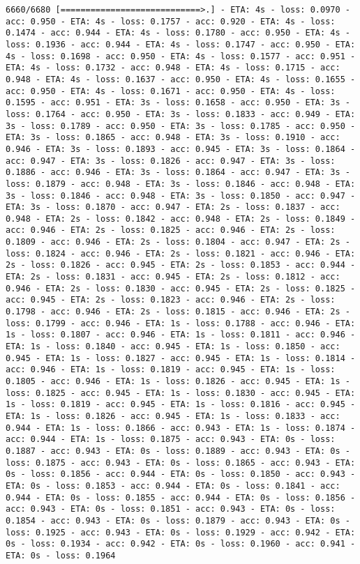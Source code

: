 \documentclass[11pt]{article}
\begin{document}
\begin{Verbatim}[commandchars=\\\{\}]
6660/6680 [============================>.] - ETA: 4s - loss: 0.0970 - acc: 0.950 - ETA: 4s - loss: 0.1757 - acc: 0.920 - ETA: 4s - loss: 0.1474 - acc: 0.944 - ETA: 4s - loss: 0.1780 - acc: 0.950 - ETA: 4s - loss: 0.1936 - acc: 0.944 - ETA: 4s - loss: 0.1747 - acc: 0.950 - ETA: 4s - loss: 0.1698 - acc: 0.950 - ETA: 4s - loss: 0.1577 - acc: 0.951 - ETA: 4s - loss: 0.1732 - acc: 0.948 - ETA: 4s - loss: 0.1715 - acc: 0.948 - ETA: 4s - loss: 0.1637 - acc: 0.950 - ETA: 4s - loss: 0.1655 - acc: 0.950 - ETA: 4s - loss: 0.1671 - acc: 0.950 - ETA: 4s - loss: 0.1595 - acc: 0.951 - ETA: 3s - loss: 0.1658 - acc: 0.950 - ETA: 3s - loss: 0.1764 - acc: 0.950 - ETA: 3s - loss: 0.1833 - acc: 0.949 - ETA: 3s - loss: 0.1789 - acc: 0.950 - ETA: 3s - loss: 0.1785 - acc: 0.950 - ETA: 3s - loss: 0.1865 - acc: 0.948 - ETA: 3s - loss: 0.1910 - acc: 0.946 - ETA: 3s - loss: 0.1893 - acc: 0.945 - ETA: 3s - loss: 0.1864 - acc: 0.947 - ETA: 3s - loss: 0.1826 - acc: 0.947 - ETA: 3s - loss: 0.1886 - acc: 0.946 - ETA: 3s - loss: 0.1864 - acc: 0.947 - ETA: 3s - loss: 0.1879 - acc: 0.948 - ETA: 3s - loss: 0.1846 - acc: 0.948 - ETA: 3s - loss: 0.1846 - acc: 0.948 - ETA: 3s - loss: 0.1850 - acc: 0.947 - ETA: 3s - loss: 0.1870 - acc: 0.947 - ETA: 2s - loss: 0.1837 - acc: 0.948 - ETA: 2s - loss: 0.1842 - acc: 0.948 - ETA: 2s - loss: 0.1849 - acc: 0.946 - ETA: 2s - loss: 0.1825 - acc: 0.946 - ETA: 2s - loss: 0.1809 - acc: 0.946 - ETA: 2s - loss: 0.1804 - acc: 0.947 - ETA: 2s - loss: 0.1824 - acc: 0.946 - ETA: 2s - loss: 0.1821 - acc: 0.946 - ETA: 2s - loss: 0.1826 - acc: 0.945 - ETA: 2s - loss: 0.1853 - acc: 0.944 - ETA: 2s - loss: 0.1831 - acc: 0.945 - ETA: 2s - loss: 0.1812 - acc: 0.946 - ETA: 2s - loss: 0.1830 - acc: 0.945 - ETA: 2s - loss: 0.1825 - acc: 0.945 - ETA: 2s - loss: 0.1823 - acc: 0.946 - ETA: 2s - loss: 0.1798 - acc: 0.946 - ETA: 2s - loss: 0.1815 - acc: 0.946 - ETA: 2s - loss: 0.1799 - acc: 0.946 - ETA: 1s - loss: 0.1788 - acc: 0.946 - ETA: 1s - loss: 0.1807 - acc: 0.946 - ETA: 1s - loss: 0.1811 - acc: 0.946 - ETA: 1s - loss: 0.1840 - acc: 0.945 - ETA: 1s - loss: 0.1850 - acc: 0.945 - ETA: 1s - loss: 0.1827 - acc: 0.945 - ETA: 1s - loss: 0.1814 - acc: 0.946 - ETA: 1s - loss: 0.1819 - acc: 0.945 - ETA: 1s - loss: 0.1805 - acc: 0.946 - ETA: 1s - loss: 0.1826 - acc: 0.945 - ETA: 1s - loss: 0.1825 - acc: 0.945 - ETA: 1s - loss: 0.1830 - acc: 0.945 - ETA: 1s - loss: 0.1819 - acc: 0.945 - ETA: 1s - loss: 0.1816 - acc: 0.945 - ETA: 1s - loss: 0.1826 - acc: 0.945 - ETA: 1s - loss: 0.1833 - acc: 0.944 - ETA: 1s - loss: 0.1866 - acc: 0.943 - ETA: 1s - loss: 0.1874 - acc: 0.944 - ETA: 1s - loss: 0.1875 - acc: 0.943 - ETA: 0s - loss: 0.1887 - acc: 0.943 - ETA: 0s - loss: 0.1889 - acc: 0.943 - ETA: 0s - loss: 0.1875 - acc: 0.943 - ETA: 0s - loss: 0.1865 - acc: 0.943 - ETA: 0s - loss: 0.1856 - acc: 0.944 - ETA: 0s - loss: 0.1850 - acc: 0.943 - ETA: 0s - loss: 0.1853 - acc: 0.944 - ETA: 0s - loss: 0.1841 - acc: 0.944 - ETA: 0s - loss: 0.1855 - acc: 0.944 - ETA: 0s - loss: 0.1856 - acc: 0.943 - ETA: 0s - loss: 0.1851 - acc: 0.943 - ETA: 0s - loss: 0.1854 - acc: 0.943 - ETA: 0s - loss: 0.1879 - acc: 0.943 - ETA: 0s - loss: 0.1925 - acc: 0.943 - ETA: 0s - loss: 0.1929 - acc: 0.942 - ETA: 0s - loss: 0.1934 - acc: 0.942 - ETA: 0s - loss: 0.1960 - acc: 0.941 - ETA: 0s - loss: 0.1964 
\end{Verbatim}
\end{document}
